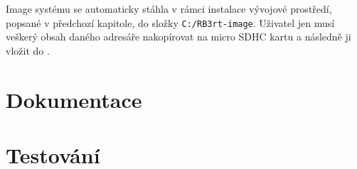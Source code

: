 Image systému se automaticky stáhla v rámci instalace vývojové prostředí, popsané v předchozí kapitole, do složky \texttt{C:/RB3rt-image}. 
Uživatel jen musí veškerý obsah daného adresáře nakopírovat na micro SDHC kartu a následně ji vložit do .


\section{Dokumentace}

\section{Testování}